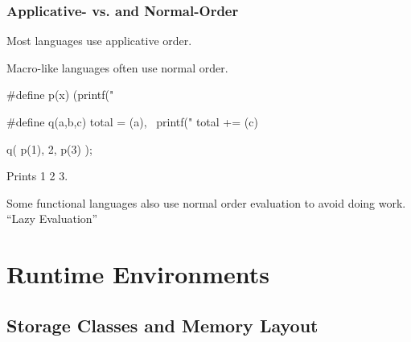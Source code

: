 \documentclass{plt}
\begin{document}
\begin{frame}[fragile=singleslide]
  \frametitle{Applicative- vs. and Normal-Order}

Most languages use applicative order.

Macro-like languages often use normal order.

\begin{C}
#define p(x) (printf("%

#define q(a,b,c) total = (a), \
   printf("%
   total += (c)

q( p(1), 2, p(3) );
\end{C}

Prints 1 2 3.

Some functional languages also use normal order evaluation to avoid
doing work.  ``Lazy Evaluation''
\end{frame}

\section{Runtime Environments}


\subsection{Storage Classes and Memory Layout}
\end{document}
